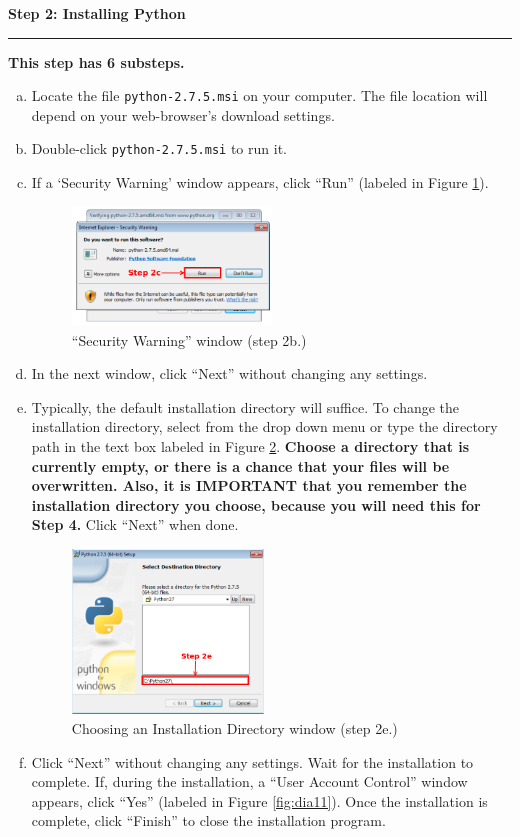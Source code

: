 \documentclass[11pt,english]{article}
\newcommand{\myhrule}{\vspace{0.3cm}\hrule\vspace{0.3cm}}
\begin{document}
\newpage
{\Large {\bf Step 2: Installing Python}}
\myhrule
{\bf This step has 6 substeps.}
\begin{enumerate}[a.]
\item Locate the file \texttt{python-2.7.5.msi} on your computer. The file
location will depend on your web-browser's download settings.
\item Double-click \texttt{python-2.7.5.msi} to run it.
\item If a `Security Warning' window appears, click ``Run'' (labeled in Figure
\ref{fig:dia2}).
\begin{figure}[h]
\begin{center}
\includegraphics[width=0.5\textwidth]{dia2}
\end{center}
\vspace{-0.5cm}
\caption{``Security Warning'' window (step 2b.)}
\label{fig:dia2}
\end{figure}
\item In the next window, click ``Next'' without changing any settings.
\item Typically, the default installation directory will suffice. To change the
installation directory, select from the drop down menu or type the directory
path in the text box labeled in Figure \ref{fig:dia3}. {\bf Choose
a directory that is currently empty, or there is a chance that your
files will be overwritten. Also, it is IMPORTANT that you remember the
installation directory you choose, because you will need this for Step 4.}
Click ``Next'' when done.
\begin{figure}[h]
\begin{center}
\includegraphics[width=0.48\textwidth]{dia3}
\end{center}
\vspace{-0.5cm}
\caption{Choosing an Installation Directory window (step 2e.)}
\label{fig:dia3}
\end{figure}
\newpage
\item Click ``Next'' without changing any settings. Wait for the installation
to complete. If, during the installation, a ``User Account Control'' window
appears, click  ``Yes'' (labeled in Figure \ref{fig:dia11}). Once the
installation is complete, click ``Finish'' to close the installation program.
\end{enumerate}
\end{document}
